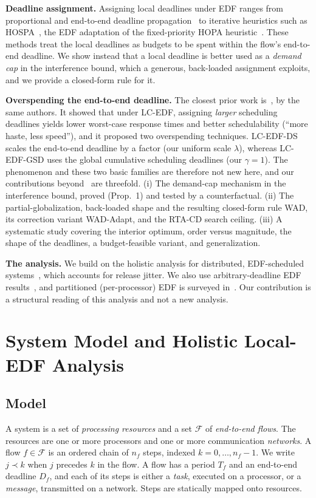\documentclass[conference]{IEEEtran}
\begin{document}
\smallskip\noindent\textbf{Deadline assignment.} Assigning local deadlines under
EDF ranges from proportional and end-to-end deadline
propagation~\cite{dinatale} to iterative heuristics such as HOSPA~\cite{hospa},
the EDF adaptation of the fixed-priority HOPA heuristic~\cite{hopa}. These
methods treat the local deadlines as budgets to be spent within the flow's
end-to-end deadline. We show instead that a local deadline is better used as a
\emph{demand cap} in the interference bound, which a generous, back-loaded
assignment exploits, and we provide a closed-form rule for it.

\smallskip\noindent\textbf{Overspending the end-to-end deadline.} The closest
prior work is~\cite{rivas15}, by the same authors. It showed that under LC-EDF,
assigning \emph{larger} scheduling deadlines yields lower worst-case response
times and better schedulability (``more haste, less speed''), and it proposed two
overspending techniques. LC-EDF-DS scales the end-to-end deadline by a factor
(our uniform scale $\lambda$), whereas LC-EDF-GSD uses the global cumulative
scheduling deadlines (our $\gamma{=}1$). The phenomenon and these two basic families are
therefore not new here, and our contributions beyond~\cite{rivas15} are
threefold. (i) The demand-cap mechanism in the interference bound, proved
(Prop.~1) and tested by a counterfactual. (ii) The partial-globalization,
back-loaded shape and the resulting closed-form rule WAD, its correction variant
WAD-Adapt, and the RTA-CD search ceiling. (iii) A systematic study covering the
interior optimum, order versus magnitude, the shape of the deadlines, a
budget-feasible variant, and generalization.

\smallskip\noindent\textbf{The analysis.} We build on the holistic analysis for
distributed, EDF-scheduled systems~\cite{audsley,holistic,palencia}, which
accounts for release jitter. We also use arbitrary-deadline EDF
results~\cite{spuri,lehozcky}, and partitioned (per-processor) EDF is surveyed
in~\cite{davis}. Our contribution is a structural reading of this analysis and
not a new analysis.

\section{System Model and Holistic Local-EDF Analysis}
\label{sec:model}

\subsection{Model}
A system is a set of \emph{processing resources} and a set $\mathcal{F}$ of
\emph{end-to-end flows}. The resources are one or more processors and one or more
communication \emph{networks}. A flow $f\!\in\!\mathcal{F}$ is an ordered chain of
$n_f$ steps, indexed $k=0,\dots,n_f{-}1$. We write $j\prec k$ when $j$ precedes
$k$ in the flow. A flow has a period $T_f$ and an end-to-end deadline $D_f$, and
each of its steps is either a \emph{task}, executed on a processor, or a
\emph{message}, transmitted on a network. Steps are statically mapped onto
resources.
\end{document}
